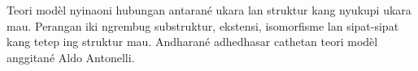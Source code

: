 \documentclass[../../include/open-logic-part]{subfiles}
\begin{document}

\begin{editorial}
Teori modèl nyinaoni hubungan antarané ukara lan struktur kang nyukupi ukara mau. Perangan iki ngrembug substruktur, ekstensi, isomorfisme lan sipat-sipat kang tetep ing struktur mau. Andharané adhedhasar cathetan teori modèl anggitané Aldo Antonelli.
\end{editorial}





\OLEndPartHook
\end{document}
